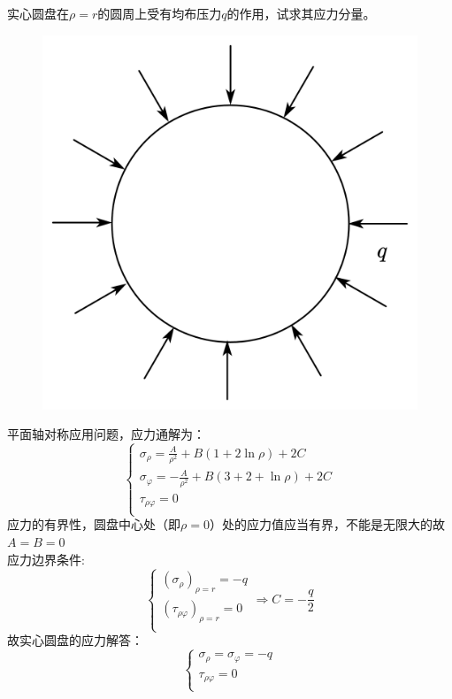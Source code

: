 \begin{example}
	实心圆盘在$\rho = r$的圆周上受有均布压力$q$的作用，试求其应力分量。
\end{example}
\begin{figure}[!h]
	\centering
	\includegraphics[scale=0.25]{figure/4-6.png}
\end{figure}
	\begin{remark}
		平面轴对称应用问题，应力通解为：
		\begin{equation*}
		\begin{cases}
		\sigma _{\rho}=\frac{A}{\rho ^2}+B\left( 1+2\ln \rho \right) +2C\\
		\sigma _{\varphi}=-\frac{A}{\rho ^2}+B\left( 3+2+\ln \rho \right) +2C\\
		\tau _{\rho \varphi}=0\\
		\end{cases}
		\end{equation*}
		应力的有界性，圆盘中心处（即$\rho=0$）处的应力值应当有界，不能是无限大的故$A=B=0$
		\\
		应力边界条件:\[\begin{cases}
		\left( \sigma _{\rho} \right) _{\rho =r}=-q\\
		\left( \tau _{\rho \varphi} \right) _{\rho =r}=0\\
		\end{cases}\Longrightarrow C=-\frac{q}{2}\]
		故实心圆盘的应力解答：\[\begin{cases}
		\sigma _{\rho}=\sigma _{\varphi}=-q\\
		\tau _{\rho \varphi}=0\\
		\end{cases}\]
	\end{remark}

